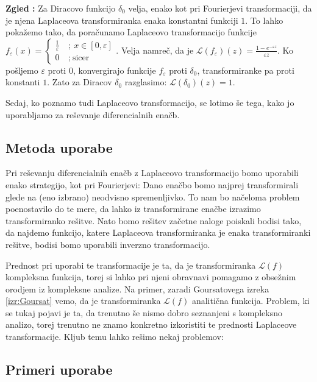 \documentclass[a4paper, 10pt]{article}
\newcounter{zgledcount}
\newenvironment{zgled}{\begin{flushleft}\refstepcounter{zgledcount}\textbf{Zgled \arabic{zgledcount}:}}{\hfill\end{flushleft}}
\begin{document}
			\begin{zgled}
				\label{zgl:diracLT}
				Za Diracovo funkcijo $\delta_{0}$ velja, enako kot pri Fourierjevi transformaciji, da je njena Laplaceova transformiranka enaka konstantni funkciji $1$. To lahko pokažemo tako, da poračunamo Laplaceovo transformacijo funkcije $f_\varepsilon(x) = \begin{cases}
				\frac{1}{\varepsilon}~&;~ x\in [0, \varepsilon] \\
				0~&;~ \text{sicer}
				\end{cases}$. Velja namreč, da je $\mathcal{L}(f_\varepsilon)(z) = \frac{1 - e^{-\varepsilon z}}{\varepsilon z}$. Ko pošljemo $\varepsilon$ proti $0$, konvergirajo funkcije $f_\varepsilon$ proti $\delta_{0}$, transformiranke pa proti konstanti $1$. Zato za Diracov $\delta_{0}$ razglasimo: $\mathcal{L}(\delta_{0})(z) = 1$.
			\end{zgled}
			
			Sedaj, ko poznamo tudi Laplaceovo transformacijo, se lotimo še tega, kako jo uporabljamo za reševanje diferencialnih enačb.
		\subsection{Metoda uporabe}
			Pri reševanju diferencialnih enačb z Laplaceovo transformacijo bomo uporabili enako strategijo, kot pri Fourierjevi: Dano enačbo bomo najprej transformirali glede na (eno izbrano) neodvisno spremenljivko. To nam bo načeloma problem poenostavilo do te mere, da lahko iz transformirane enačbe izrazimo transformiranko rešitve. Nato bomo rešitev začetne naloge poiskali bodisi tako, da najdemo funkcijo, katere Laplaceova transformiranka je enaka transformiranki rešitve, bodisi bomo uporabili inverzno transformacijo. 
			
			Prednost pri uporabi te transformacije je ta, da je transformiranka $\mathcal{L}(f)$ kompleksna funkcija, torej si lahko pri njeni obravnavi pomagamo z obsežnim orodjem iz kompleksne analize. Na primer, zaradi Goursatovega izreka \ref{izr:Goursat} vemo, da je transformiranka $\mathcal{L}(f)$ analitična funkcija. Problem, ki se tukaj pojavi je ta, da trenutno še nismo dobro seznanjeni s kompleksno analizo, torej trenutno ne znamo konkretno izkoristiti te prednosti Laplaceove transformacije. Kljub temu lahko rešimo nekaj problemov:
			
			
		\subsection{Primeri uporabe}
		
\end{document}
